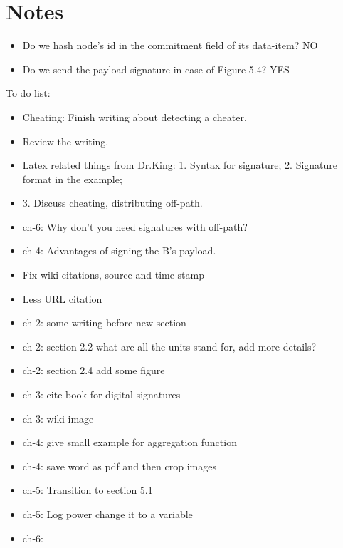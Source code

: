 \chapter{Notes}

\begin{itemize}
	\item Do we hash node's id in the commitment field of its data-item? NO
	\item Do we send the payload signature in case of Figure 5.4? YES
\end{itemize}

To do list:
\begin{itemize}
	\item Cheating: Finish writing about detecting a cheater.
	\item Review the writing.

	\item Latex related things from Dr.King: 1. Syntax for signature; 2. Signature format in the example; 
	\item 3. Discuss cheating, distributing off-path.  
	\item ch-6: Why don't you need signatures with off-path?
	\item ch-4: Advantages of signing the B's payload.

	\item Fix wiki citations, source and time stamp
	\item Less URL citation
	\item ch-2: some writing before new section
	\item ch-2: section 2.2 what are all the units stand for, add more details?
	\item ch-2: section 2.4 add some figure
	\item ch-3: cite book for digital signatures
	\item ch-3: wiki image
	\item ch-4: give small example for aggregation function
	\item ch-4: save word as pdf and then crop images
	\item ch-5: Transition to section 5.1
	\item ch-5: Log power change it to a variable
	\item ch-6: 

\end{itemize}